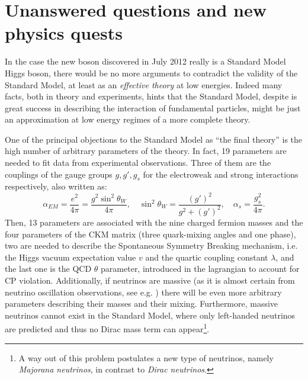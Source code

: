 
\section{Unanswered questions and new physics quests}\label{sec:THquest}

In the case the new boson discovered in July 2012 
really is a Standard Model Higgs boson, there would
be no more arguments to contradict the 
validity of the Standard Model, at least 
as an {\it effective theory} at low energies. Indeed many facts, both 
in theory and experiments, hints that the Standard Model,
despite is great success in describing the interaction
of fundamental particles, might be just an approximation
at low energy regimes of a more complete theory.

One of the principal objections to the Standard Model as 
``the final theory'' is the high number of arbitrary parameters 
of the theory. In fact, 19 parameters are needed to fit 
data from experimental observations. 
Three of them  are the couplings of the gauge groups 
$g, g', g_s$ for the electroweak and strong
interactions respectively, also written as: 
\begin{equation}\label{eq:couplings}
\alpha_{EM} = \dfrac{e^{2}}{4\pi} =  \dfrac{g^{2}\sin^{2}\theta_{W}}{4\pi}, 
\quad \sin^{2}\theta_{W} = \dfrac{(g')^{2}}{g^{2}+(g')^{2}}  ,\quad 
\alpha_{s}=\dfrac{g_{s}^{2}}{4\pi}.
\end{equation}
Then, 13 parameters are associated with the nine charged 
fermion masses and the four parameters of the CKM matrix 
(three quark-mixing angles and one phase), 
two are needed to describe the Spontaneous Symmetry Breaking mechanism, 
i.e. the Higgs vacuum expectation value $v$ and 
the quartic coupling constant $\lambda$, and the last one is the 
QCD $\theta$ parameter, introduced in the lagrangian to account
for CP violation. Additionally, if neutrinos are massive 
(as it is almost certain from neutrino oscillation observations, 
see e.g. \cite{Langacker:817840}) there will be even more arbitrary 
parameters describing their masses and their mixing. 
Furthermore, massive neutrinos cannot exist in the Standard
Model, where only left-handed neutrinos are predicted and thus
no Dirac mass term can appear\footnote{A way out of this
problem postulates a new type of neutrinos, namely 
{\it Majorana neutrinos}, in contrast to {\it Dirac neutrinos}.}.


